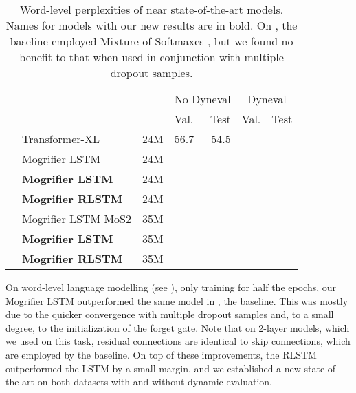 \begin{table}
  \setlength{\abovecaptionskip}{0.2\baselineskip}
  \caption[Word-level perplexities of near state-of-the-art models.]{Word-level perplexities of near state-of-the-art models.
Names for models with our new results are in bold.
On \wikitexttwo, the baseline employed Mixture of Softmaxes \citep{yang2017improved}, but we found no benefit to that when used in conjunction with multiple dropout samples.}
  \label{tab:cb-word-results}

  \centering
  \small
  \begin{tabular}{@{}llrlrlr@{}}
    & & & \multicolumn{2}{c}{No Dyneval} & \multicolumn{2}{c}{Dyneval} \\
    \cmidrule(lr){4-5} \cmidrule(l){6-7}
    & & & Val. & Test & Val. & Test \\
    \midrule
    \parbox[t]{5mm}{}
    & Transformer-XL \citep{dai2019transformer} & 24M
        & 56.7 & 54.5 & & \\
    & Mogrifier LSTM \citep{melis2019mogrifier} & 24M
        &  & 
        &  &  \\
    & \textbf{Mogrifier LSTM} & 24M
        &  & 
        &  &  \\
    & \textbf{Mogrifier RLSTM} & 24M
        &  & 
        &  &  \\
    \midrule
    \parbox[t]{5mm}{}
    & Mogrifier LSTM MoS$2$ & 35M
        &  & 
        &  &  \\
    & \textbf{Mogrifier LSTM} & 35M
        &  & 
        &  &  \\
    & \textbf{Mogrifier RLSTM} & 35M
        &  & 
        &  &  \\
    \midrule
  \end{tabular}
\end{table}

On word-level language modelling (see ), only training for half the epochs, our Mogrifier LSTM outperformed the same model in \citet{melis2019mogrifier}, the baseline.
This was mostly due to the quicker convergence with multiple dropout samples and, to a small degree, to the initialization of the forget gate.
Note that on 2-layer models, which we used on this task, residual connections are identical to skip connections, which are employed by the baseline.
On top of these improvements, the RLSTM outperformed the LSTM by a small margin, and we established a new state of the art on both datasets with and without dynamic evaluation.


